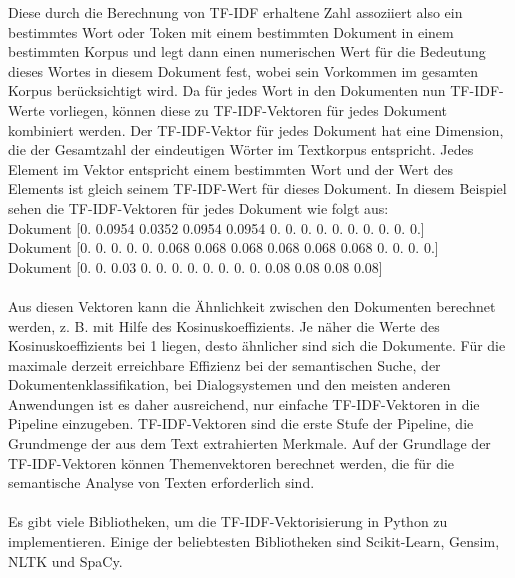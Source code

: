 Diese durch die Berechnung von \ac{TF-IDF} erhaltene Zahl assoziiert also ein bestimmtes Wort oder Token mit einem bestimmten Dokument in einem bestimmten Korpus und legt dann einen numerischen Wert für die Bedeutung dieses Wortes in diesem Dokument fest, wobei sein Vorkommen im gesamten Korpus berücksichtigt wird. 
Da für jedes Wort in den Dokumenten nun \ac{TF-IDF}-Werte vorliegen, können diese zu \ac{TF-IDF}-Vektoren für jedes Dokument kombiniert werden. 
Der \ac{TF-IDF}-Vektor für jedes Dokument hat eine Dimension, die der Gesamtzahl der eindeutigen Wörter im Textkorpus entspricht. 
Jedes Element im Vektor entspricht einem bestimmten Wort und der Wert des Elements ist gleich seinem \ac{TF-IDF}-Wert für dieses Dokument. 
In diesem Beispiel sehen die \ac{TF-IDF}-Vektoren für jedes Dokument wie folgt aus:\\
Dokument  [0. 0.0954 0.0352 0.0954 0.0954 0. 0. 0. 0. 0. 0. 0. 0. 0. 0.]\\
Dokument  [0. 0. 0. 0. 0. 0.068 0.068 0.068 0.068 0.068 0.068 0. 0. 0. 0.]\\
Dokument  [0. 0. 0.03 0. 0. 0. 0. 0. 0. 0. 0. 0.08 0.08 0.08 0.08]\\\\
Aus diesen Vektoren kann die Ähnlichkeit zwischen den Dokumenten berechnet werden, z. B. mit Hilfe des Kosinuskoeffizients. 
Je näher die Werte des Kosinuskoeffizients bei 1 liegen, desto ähnlicher sind sich die Dokumente. 
Für die maximale derzeit erreichbare Effizienz bei der semantischen Suche, der Dokumentenklassifikation, bei Dialogsystemen und den meisten anderen Anwendungen ist es daher ausreichend, nur einfache \ac{TF-IDF}-Vektoren in die Pipeline einzugeben. 
\ac{TF-IDF}-Vektoren sind die erste Stufe der Pipeline, die Grundmenge der aus dem Text extrahierten Merkmale. 
Auf der Grundlage der \ac{TF-IDF}-Vektoren können Themenvektoren berechnet werden, die für die semantische Analyse von Texten erforderlich sind.\\\\
Es gibt viele Bibliotheken, um die \ac{TF-IDF}-Vektorisierung in Python zu implementieren. 
Einige der beliebtesten Bibliotheken sind Scikit-Learn, Gensim, \ac{NLTK} und SpaCy.
